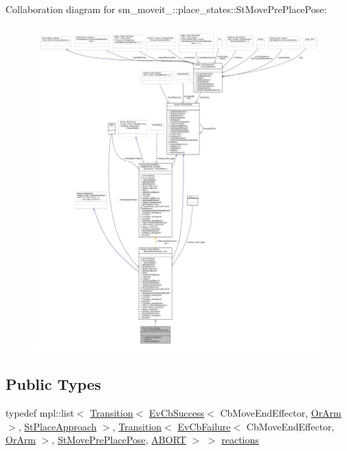 Collaboration diagram for sm\+\_\+moveit\+\_\+:\+:place\+\_\+states\+:\+:St\+Move\+Pre\+Place\+Pose\+:
\nopagebreak
\begin{figure}[H]
\begin{center}
\leavevmode
\includegraphics[width=350pt]{structsm__moveit__4_1_1place__states_1_1StMovePrePlacePose__coll__graph}
\end{center}
\end{figure}
\subsection*{Public Types}
\begin{DoxyCompactItemize}
\item 
typedef mpl\+::list$<$ \hyperlink{classsmacc_1_1Transition}{Transition}$<$ \hyperlink{structsmacc_1_1EvCbSuccess}{Ev\+Cb\+Success}$<$ Cb\+Move\+End\+Effector, \hyperlink{classsm__moveit__4_1_1OrArm}{Or\+Arm} $>$, \hyperlink{structsm__moveit__4_1_1place__states_1_1StPlaceApproach}{St\+Place\+Approach} $>$, \hyperlink{classsmacc_1_1Transition}{Transition}$<$ \hyperlink{structsmacc_1_1EvCbFailure}{Ev\+Cb\+Failure}$<$ Cb\+Move\+End\+Effector, \hyperlink{classsm__moveit__4_1_1OrArm}{Or\+Arm} $>$, \hyperlink{structsm__moveit__4_1_1place__states_1_1StMovePrePlacePose}{St\+Move\+Pre\+Place\+Pose}, \hyperlink{structsmacc_1_1default__transition__tags_1_1ABORT}{A\+B\+O\+RT} $>$ $>$ \hyperlink{structsm__moveit__4_1_1place__states_1_1StMovePrePlacePose_a70ea071312303af96209b8da75e30d4d}{reactions}
\end{DoxyCompactItemize}
